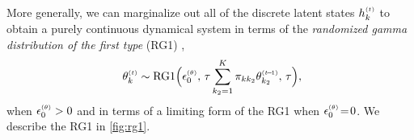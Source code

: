 \documentclass{article}
\begin{document}
More generally, we can marginalize out all of the discrete latent states $\hkt$ to obtain a purely continuous dynamical system in terms of the \emph{randomized gamma distribution of the first type} (RG1) \cite{yuan2000bessel,makarov2010exact},~
\begin{equation}
\label{eq:rg1}
\
\thetakt \sim \textrm{RG1}\Big(\epstheta,\,\tau\sum_{k_2=1}^K \pi_{kk_2} \thetakttm,\, \tau\Big),
% 
\end{equation}
when $\epstheta > 0$ and in terms of a limiting form of the RG1 when $\epstheta \teq 0$. We describe the RG1 in \cref{fig:rg1}.~


\end{document}
